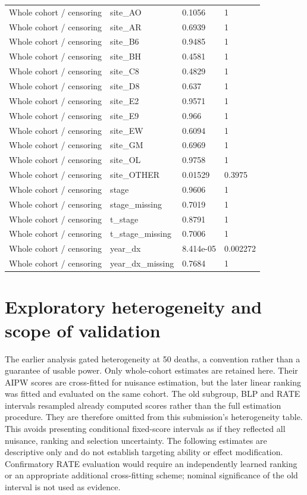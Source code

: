 \documentclass[12pt,letterpaper]{article}
\begin{document}
\begin{longtable}{p{1.55in}p{2.25in}p{0.9in}p{1.1in}}
Whole cohort / censoring & site\_AO & 0.1056 & 1 \\
Whole cohort / censoring & site\_AR & 0.6939 & 1 \\
Whole cohort / censoring & site\_B6 & 0.9485 & 1 \\
Whole cohort / censoring & site\_BH & 0.4581 & 1 \\
Whole cohort / censoring & site\_C8 & 0.4829 & 1 \\
Whole cohort / censoring & site\_D8 & 0.637 & 1 \\
Whole cohort / censoring & site\_E2 & 0.9571 & 1 \\
Whole cohort / censoring & site\_E9 & 0.966 & 1 \\
Whole cohort / censoring & site\_EW & 0.6094 & 1 \\
Whole cohort / censoring & site\_GM & 0.6969 & 1 \\
Whole cohort / censoring & site\_OL & 0.9758 & 1 \\
Whole cohort / censoring & site\_OTHER & 0.01529 & 0.3975 \\
Whole cohort / censoring & stage & 0.9606 & 1 \\
Whole cohort / censoring & stage\_missing & 0.7019 & 1 \\
Whole cohort / censoring & t\_stage & 0.8791 & 1 \\
Whole cohort / censoring & t\_stage\_missing & 0.7006 & 1 \\
Whole cohort / censoring & year\_dx & 8.414e-05 & 0.002272 \\
Whole cohort / censoring & year\_dx\_missing & 0.7684 & 1 \\
\end{longtable}
\section{Exploratory heterogeneity and scope of validation}
The earlier analysis gated heterogeneity at 50 deaths, a convention rather than a guarantee of usable
power. Only whole-cohort estimates are retained here. Their AIPW scores are cross-fitted for nuisance
estimation, but the later linear ranking was fitted and evaluated on the same cohort. The old subgroup,
BLP and RATE intervals resampled already computed scores rather than the full estimation procedure.
They are therefore omitted from this submission's heterogeneity table. This avoids presenting conditional
fixed-score intervals as if they reflected all nuisance, ranking and selection uncertainty.
The following estimates are descriptive only and do not establish targeting ability or effect modification.
Confirmatory RATE evaluation would require an independently learned ranking or an appropriate additional
cross-fitting scheme; nominal significance of the old interval is not used as evidence.
\end{document}
